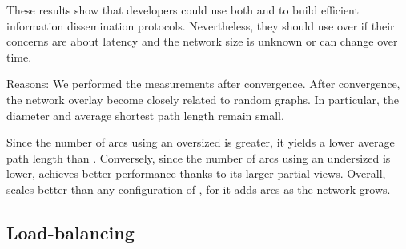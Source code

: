 \begin{asparadesc}
  These results show that developers could use both \SPRAY and \CYCLON to build
  efficient information dissemination protocols. Nevertheless, they should use
  \SPRAY over \CYCLON if their concerns are about latency and the network size
  is unknown or can change over time.

\item[Reasons:] We performed the measurements after convergence. After
  convergence, the network overlay become closely related to random graphs. In
  particular, the diameter and average shortest path length remain small.

  Since the number of arcs using an oversized \CYCLON is greater, it yields a
  lower average path length than \SPRAY. Conversely, since the number of arcs
  using an undersized \CYCLON is lower, \SPRAY achieves better performance
  thanks to its larger partial views. Overall, \SPRAY scales better than any
  configuration of \CYCLON, for it adds arcs as the network grows.
\end{asparadesc}



\subsection{Load-balancing}

